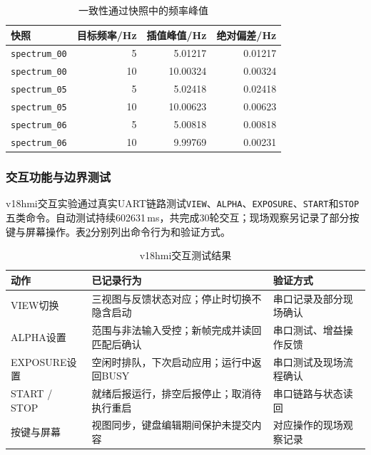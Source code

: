 \documentclass[UTF8,a4paper,zihao=-4,fontset=none]{ctexart}
\renewcommand{\small}{\fontsize{10.5pt}{13pt}\selectfont}
\numberwithin{figure}{section}
\numberwithin{table}{section}
\begin{document}
\begin{table}[htbp]
\centering\small
\caption{一致性通过快照中的频率峰值}\label{tab:frequency-peaks}
\begin{tabular}{@{}lrrr@{}}
\toprule
快照 & 目标频率/Hz & 插值峰值/Hz & 绝对偏差/Hz \\
\midrule
\texttt{spectrum\_00} & 5 & 5.01217 & 0.01217 \\
\texttt{spectrum\_00} & 10 & 10.00324 & 0.00324 \\
\texttt{spectrum\_05} & 5 & 5.02418 & 0.02418 \\
\texttt{spectrum\_05} & 10 & 10.00623 & 0.00623 \\
\texttt{spectrum\_06} & 5 & 5.00818 & 0.00818 \\
\texttt{spectrum\_06} & 10 & 9.99769 & 0.00231 \\
\bottomrule
\end{tabular}
\end{table}

\subsubsection{交互功能与边界测试}
\label{sec:interaction}
v18hmi交互实验通过真实UART链路测试\texttt{VIEW}、\texttt{ALPHA}、\texttt{EXPOSURE}、\texttt{START}和\texttt{STOP}五类命令。自动测试持续602631\,ms，共完成30轮交互；现场观察另记录了部分按键与屏幕操作。表\ref{tab:interaction-results}分别列出命令行为和验证方式。

\begin{table}[htbp]
\centering\small
\caption{v18hmi交互测试结果}\label{tab:interaction-results}
\begin{tabularx}{\linewidth}{@{}p{2.2cm}X p{3.1cm}@{}}
\toprule
动作 & 已记录行为 & 验证方式 \\
\midrule
VIEW切换 & 三视图与反馈状态对应；停止时切换不隐含启动 & 串口记录及部分现场确认 \\
ALPHA设置 & 范围与非法输入受控；新帧完成并读回匹配后确认 & 串口测试、增益操作反馈 \\
EXPOSURE设置 & 空闲时排队，下次启动应用；运行中返回BUSY & 串口测试及现场流程确认 \\
START / STOP & 就绪后报运行，排空后报停止；取消待执行重启 & 串口链路与状态读回 \\
按键与屏幕 & 视图同步，键盘编辑期间保护未提交内容 & 对应操作的现场观察记录 \\
\bottomrule
\end{tabularx}
\end{table}
\end{document}
